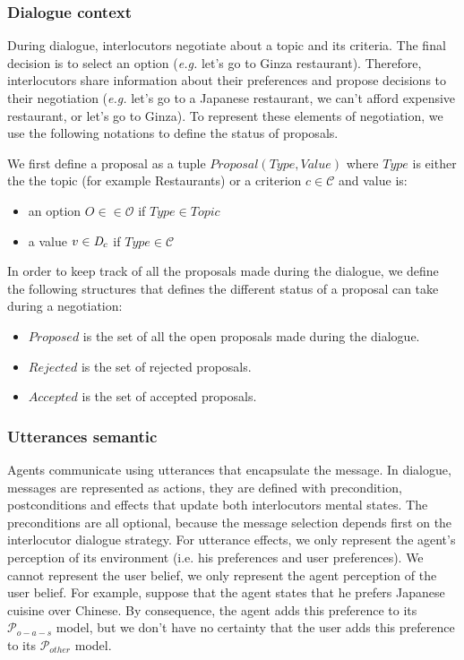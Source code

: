 \documentclass{llncs}
\begin{document}
 
\subsubsection{Dialogue context}
 
During dialogue, interlocutors  negotiate  about a topic and its criteria. The final decision is to select an option (\emph{e.g.} let's go to Ginza restaurant). Therefore, interlocutors share information about their preferences and propose decisions to their negotiation (\emph{e.g.} let's go to a Japanese restaurant, we can't afford expensive restaurant, or let's go to Ginza). To represent these elements of negotiation, we use the following notations to define the status of proposals.

We first define a proposal as a tuple $Proposal(Type, Value)$ where  $Type$ is either the the topic (for example Restaurants) or a criterion $c \in \mathcal{C}$ and value is:
\begin{itemize}
	\item an option $O \in \in \mathcal{O}$ if $Type \in Topic$ 
	\item a value $v \in \emph{D}_c$ if $Type \in \mathcal{C}$
\end{itemize}
    

In order to keep track of all the proposals made during the dialogue, we define the following structures that defines the different status of a proposal can take during a negotiation:
 \begin{itemize}
	 	\item $Proposed$ is the set of all the open proposals made during the dialogue.
	 	\item $Rejected$  is the set of rejected proposals.
	 	\item $Accepted$  is the set of accepted proposals.
 \end{itemize}


\subsubsection{Utterances semantic}
Agents communicate using utterances that encapsulate the message. In dialogue, messages are represented as actions, they are defined with precondition, postconditions and effects that update both interlocutors mental states. The preconditions are all optional, because the message selection depends first on the interlocutor dialogue strategy. For utterance effects, we only represent the  agent's perception of its environment (i.e. his preferences and user preferences). We cannot represent the user belief, we only represent the agent perception of the user belief. For example, suppose that the agent states that he prefers Japanese cuisine over Chinese. By consequence, the agent adds this preference to its $\mathcal{P}_{o-a-s}$ model, but we don't have no certainty that the user adds this preference to its $\mathcal{P}_{other}$  model.
\end{document}
